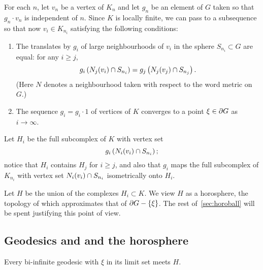 \documentclass[a4paper]{article}
\begin{document}
For each $n$, let $v_n$ be a vertex of $K_n$ and let $g_n$ be an element of $G$
taken so that $g_n\cdot v_n$ is independent of $n$.  Since $K$ is locally
finite, we can pass to a subsequence so that now $v_i \in K_{n_i}$ satisfying
the following conditions:
\begin{enumerate}
  \item
    The translates by $g_i$ of large neighbourhoods of $v_i$ in the sphere
    $S_{n_i} \subset G$ are equal: for any $i \geq j$,
    \begin{equation*}
      g_i\left(N_j(v_i) \cap S_{n_i}\right) 
            = g_j\left(N_j(v_j) \cap S_{n_j}\right).
    \end{equation*}
    (Here $N$ denotes a neighbourhood taken with respect to the word metric on
    $G$.)
  \item
    The sequence $g_i = g_i\cdot 1$ of vertices of $K$ converges to a point
    $\xi \in \partial G$ as $i\to\infty$.
\end{enumerate}

Let $H_i$ be the full subcomplex of $K$ with vertex set
\begin{equation*}
  g_i\left(N_i(v_i) \cap S_{n_i}\right);
\end{equation*}
notice that $H_i$ contains $H_j$ for $i \geq j$, and also that $g_i$ maps the
full subcomplex of $K_{n_i}$ with vertex set $N_i(v_i) \cap S_{n_i}$
isometrically onto $H_i$. 

Let $H$ be the union of the complexes $H_i \subset K$. We view $H$ as a
horosphere, the topology of which approximates that of $\partial G - \left\{\xi\right\}$.
The rest of~\ref{sec:horoball} will be spent justifying this point of view.

\subsection{Geodesics and and the horosphere}

\begin{lemma}\label{lem:geodesicsmeethorosphere}
  Every bi-infinite geodesic with $\xi$ in its limit set meets $H$.
\end{lemma}
\end{document}
